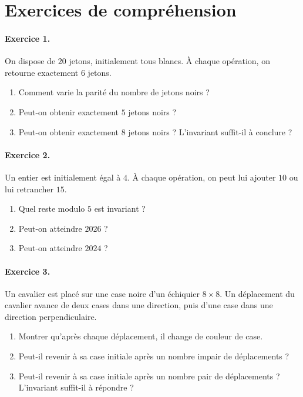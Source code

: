 \section{Exercices de compréhension}

\paragraph{Exercice 1.}
On dispose de \(20\) jetons, initialement tous blancs. À chaque opération, on
retourne exactement \(6\) jetons.

\begin{enumerate}
    \item Comment varie la parité du nombre de jetons noirs ?
    \item Peut-on obtenir exactement \(5\) jetons noirs ?
    \item Peut-on obtenir exactement \(8\) jetons noirs ? L'invariant suffit-il
    à conclure ?
\end{enumerate}

\paragraph{Exercice 2.}
Un entier est initialement égal à \(4\). À chaque opération, on peut lui ajouter
\(10\) ou lui retrancher \(15\).

\begin{enumerate}
    \item Quel reste modulo \(5\) est invariant ?
    \item Peut-on atteindre \(2026\) ?
    \item Peut-on atteindre \(2024\) ?
\end{enumerate}

\paragraph{Exercice 3.}
Un cavalier est placé sur une case noire d'un échiquier \(8\times8\). Un
déplacement du cavalier avance de deux cases dans une direction, puis d'une
case dans une direction perpendiculaire.

\begin{enumerate}
    \item Montrer qu'après chaque déplacement, il change de couleur de case.
    \item Peut-il revenir à sa case initiale après un nombre impair de
    déplacements ?
    \item Peut-il revenir à sa case initiale après un nombre pair de
    déplacements ? L'invariant suffit-il à répondre ?
\end{enumerate}

